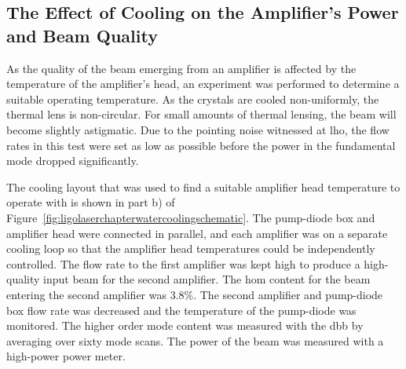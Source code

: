 \subsection{The Effect of Cooling on the Amplifier's Power and Beam Quality}
\par
As the quality of the beam emerging from an amplifier is affected by the temperature of the amplifier's head, an experiment was performed to determine a suitable operating temperature. As the  crystals are cooled non-uniformly, the thermal lens is non-circular. For small amounts of thermal lensing, the beam will become slightly astigmatic. Due to the pointing noise witnessed at \gls{lho}, the flow rates in this test were set as low as possible before the power in the fundamental mode dropped significantly.
\par
The cooling layout that was used to find a suitable amplifier head temperature to operate with is shown in part b) of Figure~\ref{fig:ligolaserchapterwatercoolingschematic}. The pump-diode box and amplifier head were connected in parallel, and each amplifier was on a separate cooling loop so that the amplifier head temperatures could be independently controlled. The flow rate to the first amplifier was kept high to produce a high-quality input beam for the second amplifier. The \gls{hom} content for the beam entering the second amplifier was 3.8\%. The second amplifier and pump-diode box flow rate was decreased and the temperature of the pump-diode was monitored. The higher order mode content was measured with the \gls{dbb} by averaging over sixty mode scans. The power of the beam was measured with a high-power power meter. 
